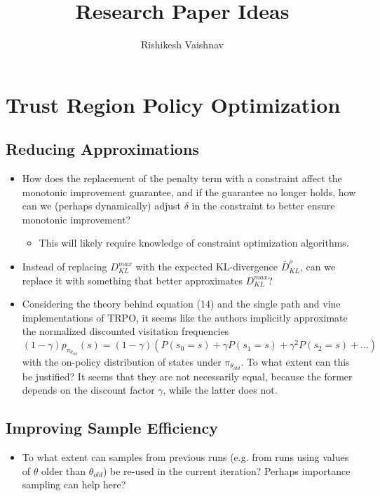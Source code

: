 \documentclass[a4paper]{article}
\title{Research Paper Ideas}
\author{Rishikesh Vaishnav}
\begin{document}
\maketitle
\section*{Trust Region Policy Optimization}
\subsection*{Reducing Approximations}
\begin{itemize}
    \item How does the replacement of the penalty term with a constraint affect
        the monotonic improvement guarantee, and if the guarantee no longer
        holds, how can we (perhaps dynamically) adjust $\delta$ in the
        constraint to better ensure monotonic improvement?
    \begin{itemize}
        \item This will likely require knowledge of constraint optimization
            algorithms.
    \end{itemize}
    \item Instead of replacing $D_{KL}^{max}$ with the expected KL-divergence
        $\bar{D}_{KL}^{\rho}$, can we replace it with something that better
        approximates $D_{KL}^{max}$?
    \item Considering the theory behind equation (14) and the single path and
        vine implementations of TRPO, it seems like the authors implicitly
        approximate the normalized discounted visitation frequencies $(1 -
        \gamma)p_{\pi_{\theta_{old}}}(s) = (1 - \gamma)(P(s_0 = s) + \gamma
        P(s_1 = s) + \gamma^{2} P(s_2 = s) + \dots)$ with the on-policy
        distribution of states under $\pi_{\theta_{old}}$. To what extent can
        this be justified? It seems that they are not necessarily equal,
        because the former depends on the discount factor $\gamma$, while the
        latter does not.
\end{itemize}
\subsection*{Improving Sample Efficiency}
\begin{itemize}
    \item To what extent can samples from previous runs (e.g. from runs using
        values of $\theta$ older than $\theta_{old}$) be re-used in the current
        iteration? Perhaps importance sampling can help here?
\end{itemize}
\end{document}

